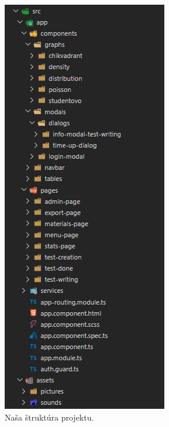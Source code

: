 \begin{figure}[H]
\begin{minipage}[t]{0.48\textwidth}
  \end{minipage}
  \hfill
  \begin{minipage}[t]{0.48\textwidth}
    \centering
    \includegraphics[width=\linewidth]{img/project-structure.png}
    \caption{Naša štruktúra projektu.}
    \label{fig:project-structure}
  \end{minipage}
\end{figure}


